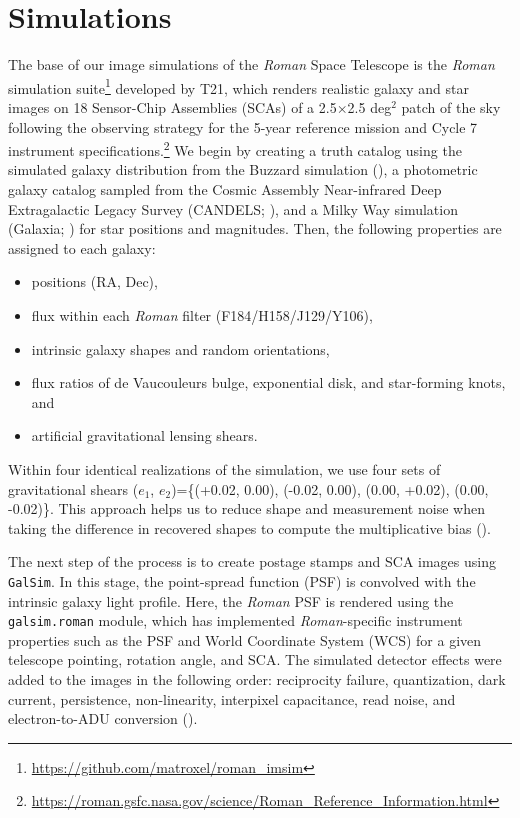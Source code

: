 \documentclass[fleqn,usenatbib]{mnras}
\begin{document}
\section{Simulations}
\label{sec:sims}
The base of our image simulations of the \emph{Roman} Space Telescope is the \emph{Roman} simulation suite\footnote{\url{ https://github.com/matroxel/roman_imsim}} developed by T21, which renders realistic galaxy and star images on 18 Sensor-Chip Assemblies (SCAs) of a 2.5$\times$2.5 \textrm{deg}$^{2}$ patch of the sky following the observing strategy for the 5-year reference mission and Cycle 7 instrument specifications.\footnote{\url{https://roman.gsfc.nasa.gov/science/Roman_Reference_Information.html}} We begin by creating a truth catalog using the simulated galaxy distribution from the Buzzard simulation (\citealt{2019arXiv190102401D}), a photometric galaxy catalog sampled from the Cosmic Assembly Near-infrared Deep Extragalactic Legacy Survey (CANDELS; \citealt{2011ApJS..197...35G, 2011ApJS..197...36K, 2019ApJ...877..117H}), and a Milky Way simulation (Galaxia; \citealt{2011ApJ...730....3S}) for star positions and magnitudes. Then, the following properties are assigned to each galaxy:
\begin{itemize}
    \item positions (RA, Dec),
    \item flux within each \emph{Roman} filter (F184/H158/J129/Y106),
    \item intrinsic galaxy shapes and random orientations,
    \item flux ratios of de Vaucouleurs bulge, exponential disk, and star-forming knots, and
    \item artificial gravitational lensing shears.
\end{itemize} 
Within four identical realizations of the simulation, we use four sets of gravitational shears ($e_{1}$, $e_{2}$)=\{(+0.02, 0.00), (-0.02, 0.00), (0.00, +0.02), (0.00, -0.02)\}. This approach helps us to reduce shape and measurement noise when taking the difference in recovered shapes to compute the multiplicative bias (\citealt{2019A&A...621A...2P}). 


The next step of the process is to create postage stamps and SCA images using \texttt{GalSim}. In this stage, the point-spread function (PSF) is convolved with the intrinsic galaxy light profile. Here, the \emph{Roman} PSF is rendered using the \texttt{galsim.roman} module, which has implemented \emph{Roman}-specific instrument properties such as the PSF and World Coordinate System (WCS) for a given telescope pointing, rotation angle, and SCA. The simulated detector effects were added to the images in the following order: reciprocity failure, quantization, dark current, persistence, non-linearity, interpixel capacitance, read noise, and electron-to-ADU conversion (\citealt{2020JATIS...6d6001M}).
\end{document}
